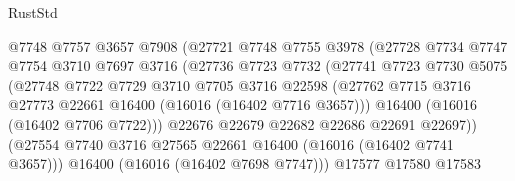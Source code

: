 \begin{lexlean}{RustStd}
\begin{coremodule}
                                @7748
                                @7757
                                @3657
                                @7908
                                (@27721
                                  @7748
                                  @7755
                                  @3978
                                  (@27728
                                    @7734
                                    @7747
                                    @7754
                                    @3710
                                    @7697
                                    @3716
                                    (@27736
                                      @7723
                                      @7732
                                      (@27741
                                        @7723
                                        @7730
                                        @5075
                                        (@27748
                                          @7722
                                          @7729
                                          @3710
                                          @7705
                                          @3716
                                          @22598
                                          (@27762
                                            @7715
                                            @3716
                                            @27773
                                            @22661
                                            @16400
                                            (@16016 (@16402 @7716 @3657)))
                                          @16400
                                          (@16016 (@16402 @7706 @7722)))
                                        @22676
                                        @22679
                                        @22682
                                        @22686
                                        @22691
                                        @22697))
                                    (@27554
                                      @7740
                                      @3716
                                      @27565
                                      @22661
                                      @16400
                                      (@16016 (@16402 @7741 @3657)))
                                    @16400
                                    (@16016 (@16402 @7698 @7747)))
                                  @17577
                                  @17580
                                  @17583

\end{coremodule}
\end{lexlean}
